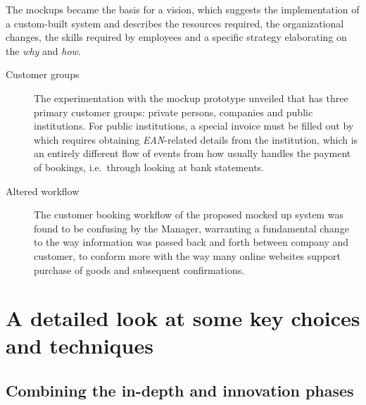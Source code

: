 The mockups became the basis for a vision, which suggests the implementation of
a custom-built system and describes the resources required, the organizational
changes, the skills required by employees and a specific strategy elaborating on
the \textit{why} and \textit{how}.

\begin{description}
    \item [Customer groups] The experimentation with the mockup prototype unveiled that 
        \gomonkey{} has three primary customer groups: private persons, companies and public
        institutions. For public institutions, a special invoice must be filled
        out by \gomonkey{} which requires obtaining \textit{EAN}-related details
        from the institution, which is an entirely different flow of events from
        how \gomonkey{} usually handles the payment of bookings, i.e.\ through
        looking at bank statements. 
    \item [Altered workflow] The customer booking workflow of the proposed mocked up 
        system was found to be confusing by the Manager, warranting a fundamental change 
        to the way information was passed back and forth between company and customer, 
        to conform more with the way many online websites support purchase of goods and 
        subsequent confirmations.
\end{description}

\section{A detailed look at some key choices and techniques} \label{sec:detailed}
\subsection{Combining the in-depth and innovation phases}

% 

